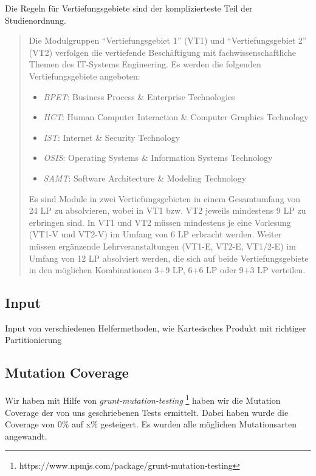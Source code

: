 \documentclass[ngerman]{article}
\begin{document}
Die Regeln für Vertiefungsgebiete sind der komplizierteste Teil der Studienordnung.
\begin{quote}
    \begin{displayquote}
Die Modulgruppen ``Vertiefungsgebiet 1'' (VT1) und ``Vertiefungsgebiet 2'' (VT2) verfolgen die vertiefende Beschäftigung mit fachwissenschaftliche Themen des IT-Systems Engineering.
Es werden die folgenden Vertiefungsgebiete angeboten:
\begin{itemize}
    \item \emph{BPET}: Business Process \& Enterprise Technologies
    \item \emph{HCT}: Human Computer Interaction \& Computer Graphics Technology
    \item \emph{IST}: Internet \& Security Technology
    \item \emph{OSIS}: Operating Systems \& Information Systems Technology
    \item \emph{SAMT}: Software Architecture \& Modeling Technology
\end{itemize}
Es sind Module in zwei Vertiefungsgebieten in einem Gesamtumfang von 24 LP zu absolvieren, wobei in VT1
bzw. VT2 jeweils mindestens 9 LP zu erbringen sind. In VT1 und VT2 müssen mindestens je eine Vorlesung
(VT1-V und VT2-V) im Umfang von 6 LP erbracht werden. Weiter müssen ergänzende Lehrveranstaltungen
(VT1-E, VT2-E, VT1/2-E) im Umfang von 12 LP absolviert werden, die sich auf beide Vertiefungsgebiete in
den möglichen Kombinationen 3+9 LP, 6+6 LP oder 9+3 LP verteilen. 
    \end{displayquote}
    \label{quo:vertiefungsgebiete}
\end{quote}

\subsection{Input}
Input von verschiedenen Helfermethoden, wie Kartesisches Produkt mit richtiger Partitionierung


\subsection{Mutation Coverage}
Wir haben mit Hilfe von \emph{grunt-mutation-testing} \footnote{https://www.npmjs.com/package/grunt-mutation-testing} haben wir die Mutation Coverage der von uns geschriebenen Tests ermittelt.
Dabei haben wurde die Coverage von 0\% auf x\% gesteigert. Es wurden alle möglichen Mutationsarten angewandt.
\end{document}
